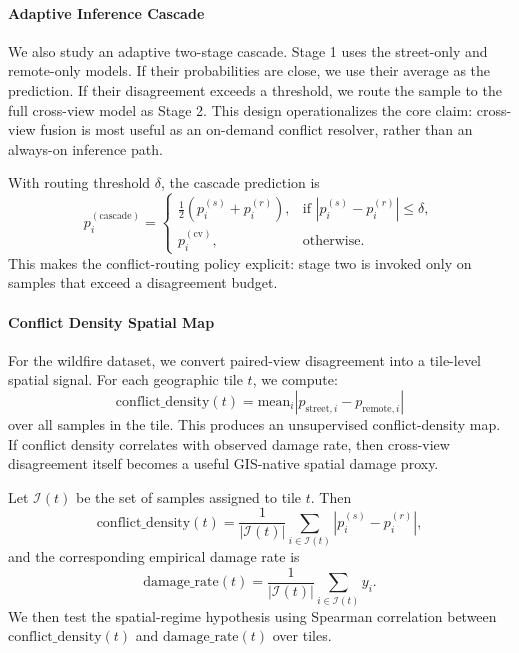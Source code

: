 \documentclass[sigconf]{acmart}
\begin{document}
\paragraph{Adaptive Inference Cascade}

We also study an adaptive two-stage cascade. Stage 1 uses the street-only and
remote-only models. If their probabilities are close, we use their average as
the prediction. If their disagreement exceeds a threshold, we route the sample
to the full cross-view model as Stage 2. This design operationalizes the core
claim: cross-view fusion is most useful as an on-demand conflict resolver,
rather than an always-on inference path.

With routing threshold $\delta$, the cascade prediction is
\begin{equation}
p_i^{(\mathrm{cascade})}=
\begin{cases}
\frac{1}{2}\left(p_i^{(s)}+p_i^{(r)}\right),
& \text{if }\left|p_i^{(s)}-p_i^{(r)}\right|\le\delta,\\[4pt]
p_i^{(\mathrm{cv})},
& \text{otherwise.}
\end{cases}
\label{eq:cascade}
\end{equation}
This makes the conflict-routing policy explicit: stage two is invoked only on
samples that exceed a disagreement budget.

\paragraph{Conflict Density Spatial Map}

For the wildfire dataset, we convert paired-view disagreement into a tile-level
spatial signal. For each geographic tile $t$, we compute:
\[
\mathrm{conflict\_density}(t) = \mathrm{mean}_i |p_{\mathrm{street},i} - p_{\mathrm{remote},i}|
\]
over all samples in the tile. This produces an unsupervised conflict-density
map. If conflict density correlates with observed damage rate, then cross-view
disagreement itself becomes a useful GIS-native spatial damage proxy.

Let $\mathcal{I}(t)$ be the set of samples assigned to tile $t$. Then
\begin{equation}
\mathrm{conflict\_density}(t)
=
\frac{1}{|\mathcal{I}(t)|}
\sum_{i\in\mathcal{I}(t)}
\left|p_i^{(s)}-p_i^{(r)}\right|,
\label{eq:conflictdensity}
\end{equation}
and the corresponding empirical damage rate is
\begin{equation}
\mathrm{damage\_rate}(t)=
\frac{1}{|\mathcal{I}(t)|}
\sum_{i\in\mathcal{I}(t)} y_i.
\label{eq:damagerate}
\end{equation}
We then test the spatial-regime hypothesis using Spearman correlation between
$\mathrm{conflict\_density}(t)$ and $\mathrm{damage\_rate}(t)$ over tiles.
\end{document}
